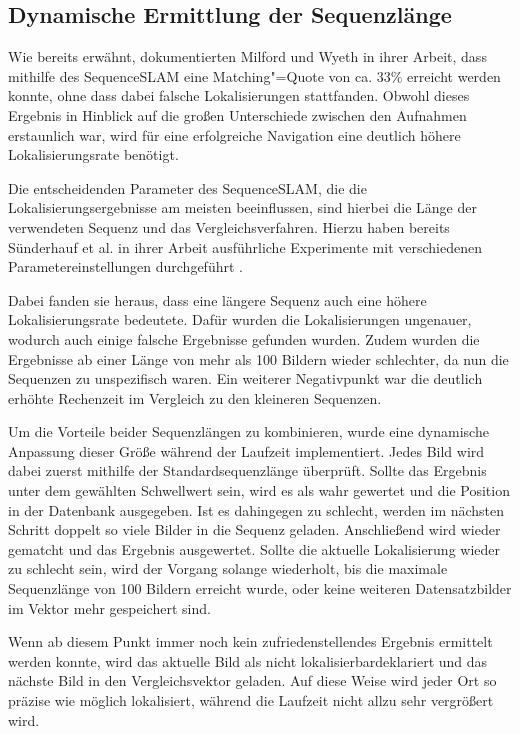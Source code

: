 \documentclass[12pt,a4paper,titlepage]{scrartcl}
\begin{document}
\subsection{Dynamische Ermittlung der Sequenzlänge}
Wie bereits erwähnt, dokumentierten Milford und Wyeth in ihrer Arbeit, dass mithilfe des SequenceSLAM eine Matching"=Quote von ca. $33\%$ erreicht werden konnte, ohne dass dabei falsche Lokalisierungen stattfanden. Obwohl dieses Ergebnis in Hinblick auf die großen Unterschiede zwischen den Aufnahmen erstaunlich war, wird für eine erfolgreiche Navigation eine deutlich höhere Lokalisierungsrate benötigt.

Die entscheidenden Parameter des SequenceSLAM, die die Lokalisierungsergebnisse  am meisten beeinflussen, sind hierbei die Länge der verwendeten Sequenz und das Vergleichsverfahren. Hierzu haben bereits Sünderhauf et al. in ihrer Arbeit ausführliche Experimente mit verschiedenen Parametereinstellungen durchgeführt \cite{sunderhauf2013we}. 

Dabei fanden sie heraus, dass eine längere Sequenz auch eine höhere Lokalisierungsrate bedeutete. Dafür wurden die Lokalisierungen ungenauer, wodurch auch einige falsche Ergebnisse gefunden wurden. Zudem wurden die Ergebnisse ab einer Länge von mehr als 100 Bildern wieder schlechter, da nun die Sequenzen zu unspezifisch waren. Ein weiterer Negativpunkt war die deutlich erhöhte Rechenzeit im Vergleich zu den kleineren Sequenzen. 

Um die Vorteile beider Sequenzlängen zu kombinieren, wurde eine dynamische Anpassung dieser Größe während der Laufzeit implementiert. Jedes Bild wird dabei zuerst mithilfe der Standardsequenzlänge überprüft. Sollte das Ergebnis unter dem gewählten Schwellwert sein, wird es als wahr gewertet und die Position in der Datenbank ausgegeben. Ist es dahingegen zu schlecht, werden im nächsten Schritt doppelt so viele Bilder in die Sequenz geladen. Anschließend wird wieder gematcht und das Ergebnis ausgewertet. Sollte die aktuelle Lokalisierung wieder zu schlecht sein, wird der Vorgang solange wiederholt, bis die maximale Sequenzlänge von 100 Bildern erreicht wurde, oder keine weiteren Datensatzbilder im Vektor mehr gespeichert sind.

Wenn ab diesem Punkt immer noch kein zufriedenstellendes Ergebnis ermittelt werden konnte, wird das aktuelle Bild als \glqq nicht lokalisierbar\grqq{ }deklariert und das nächste Bild in den Vergleichsvektor geladen. Auf diese Weise wird jeder Ort so präzise wie möglich lokalisiert, während die Laufzeit nicht allzu sehr vergrößert wird.
\end{document}
